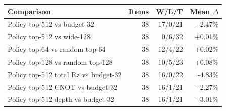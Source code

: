 \begin{tabular}{lrrr}
\toprule
Comparison & Items & W/L/T & Mean $\Delta$ \\
\midrule
Policy top-512 vs budget-32 & 38 & 17/0/21 & -2.47\% \\
Policy top-512 vs wide-128 & 38 & 0/6/32 & +0.01\% \\
Policy top-64 vs random top-64 & 38 & 12/4/22 & +0.02\% \\
Policy top-128 vs random top-128 & 38 & 10/5/23 & +0.08\% \\
Policy top-512 total Rz vs budget-32 & 38 & 16/0/22 & -4.83\% \\
Policy top-512 CNOT vs budget-32 & 38 & 16/1/21 & -2.27\% \\
Policy top-512 depth vs budget-32 & 38 & 16/1/21 & -3.01\% \\
\bottomrule
\end{tabular}
